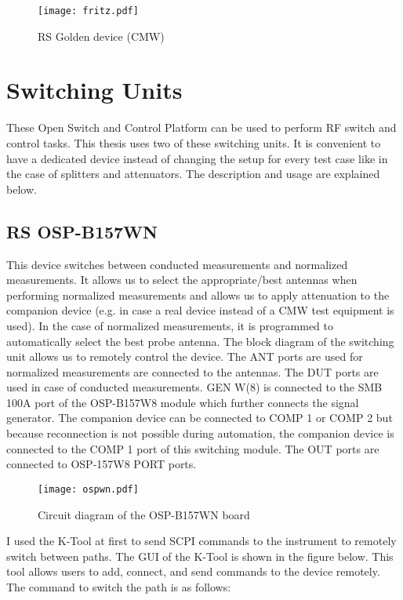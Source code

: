 \begin{figure}[H]
\centering
\texttt{[image: fritz.pdf]}
\caption{\acs{RS}\textregistered{} Golden device (\acs{CMW})}
\label{fig:cmwGUI}
\end{figure}

\section{Switching Units}
These Open Switch and Control Platform can be used to perform \acs{RF} switch and control tasks. This thesis uses two of these switching units. It is convenient to have a dedicated device instead of changing the setup for every test case like in the case of splitters and attenuators. The description and usage are explained below.

\subsection{\acs{RS}\textregistered{} \ac{OSP}-B157WN} \label{sec:wn}
This device switches between conducted measurements and normalized measurements. It allows us to select the appropriate/best antennas when performing normalized measurements and allows us to apply attenuation to the companion device (e.g. in case a real device instead of a \acs{CMW} test equipment is used). In the case of normalized measurements, it is programmed to automatically select the best probe antenna. The block diagram of the switching unit allows us to remotely control the device. The ANT ports are used for normalized measurements are connected to the antennas. The \acs{DUT} ports are used in case of conducted measurements. GEN W(8) is connected to the SMB 100A port of the \acs{OSP}-B157W8 module which further connects the signal generator. The companion device can be connected to COMP 1 or COMP 2 but because reconnection is not possible during automation, the companion device is connected to the COMP 1 port of this switching module. The OUT ports are connected to \acs{OSP}-157W8 PORT ports.

\begin{figure}[H]
\centering
\texttt{[image: ospwn.pdf]}
\caption{Circuit diagram of the \acs{OSP}-B157WN board}
\label{fig:ospwn}
\end{figure}

I used the K-Tool at first to send \acs{SCPI} commands to the instrument to remotely switch between paths. The \acs{GUI} of the K-Tool is shown in the figure below. This tool allows users to add, connect, and send commands to the device remotely. The command to switch the path is as follows: 

